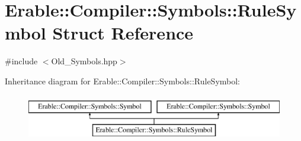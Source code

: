 \hypertarget{class_erable_1_1_compiler_1_1_symbols_1_1_rule_symbol}{}\section{Erable\+::Compiler\+::Symbols\+::Rule\+Symbol Struct Reference}
\label{class_erable_1_1_compiler_1_1_symbols_1_1_rule_symbol}


{\ttfamily \#include $<$Old\+\_\+\+Symbols.\+hpp$>$}

Inheritance diagram for Erable\+::Compiler\+::Symbols\+::Rule\+Symbol\+:\begin{figure}[H]
\begin{center}
\leavevmode
\includegraphics[height=2.000000cm]{class_erable_1_1_compiler_1_1_symbols_1_1_rule_symbol}
\end{center}
\end{figure}
